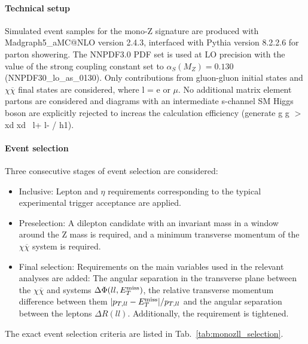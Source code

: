 \paragraph{Technical setup}
Simulated event samples for the mono-Z signature are produced with Madgraph5\_aMC@NLO version 2.4.3, interfaced with Pythia version 8.2.2.6 for parton showering. The NNPDF3.0 PDF set is used at LO precision with the value of the strong coupling constant set to $\alpha_{S}(M_{Z}) = 0.130$ (NNPDF30\_lo\_as\_0130). Only contributions from gluon-gluon initial states and \lp\lm$\chi\overline{\chi}$ final states are considered, where l = e or $\mu$. No additional matrix element partons are considered and diagrams with an intermediate s-channel SM Higgs boson are explicitly rejected to increas the calculation efficiency (generate g g $>$ xd xd~ l+ l- / h1). 


\paragraph{Event selection}
Three consecutive stages of event selection are considered:
\begin{itemize}
\item Inclusive: Lepton \pt and $\eta$ requirements corresponding to the typical experimental trigger acceptance are applied.

\item Preselection: A dilepton candidate with an invariant mass in a window around the Z mass is required, and a minimum transverse momentum of the $\chi\overline{\chi}$ system is required.

\item Final selection: Requirements on the main variables used in the relevant analyses are added: The angular separation in the transverse plane between the $\chi\overline{\chi}$ and \lp\lm systems $\Delta\Phi(ll,E_T^\mathrm{miss})$, the relative transverse momentum difference between them $|p_{T,ll} - E_T^\mathrm{miss}|/p_{T,ll}$ and the angular separation between the leptons $\Delta R(ll)$. Additionally, the \MET requirement is tightened.
\end{itemize}

The exact event selection criteria are listed in Tab.~\ref{tab:monozll_selection}.

